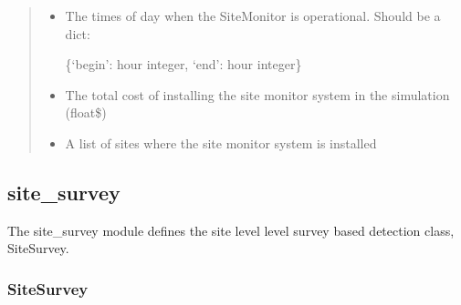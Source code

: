 \documentclass[letterpaper,10pt,english]{sphinxmanual}
\begin{document}
\begin{fulllineitems}
\begin{quote}
\begin{description}
\begin{itemize}
\item {} 
 \textendash{} 
The times of day when the SiteMonitor is operational. Should be a dict:

\{‘begin’: hour integer, ‘end’: hour integer\}


\item {} 
 \textendash{} The total cost of installing the site monitor system in the simulation (float\textendash{}\$)

\item {} 
 \textendash{} A list of sites where the site monitor system is installed

\end{itemize}

\end{description}\end{quote}

\end{fulllineitems}



\subsection{site\_survey}
\label{\detokenize{index:module-feast.DetectionModules.site_survey}}\label{\detokenize{index:site-survey}}
The site\_survey module defines the site level level survey based detection class, SiteSurvey.


\subsubsection{SiteSurvey}
\label{\detokenize{index:sitesurvey}}
\end{document}
